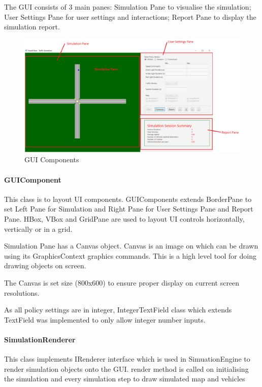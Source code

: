 \documentclass[11pt]{article}
\begin{document}
{\begin{itemize}
The GUI consists of 3 main panes: Simulation Pane to visualise the simulation; User Settings Pane for user settings and interactions; Report Pane to display the simulation report. 

 \begin{figure}[H]
        \includegraphics[width=16cm]{GUIComponent} 
        \caption{GUI Components } 
        \label{gui}
    \end{figure}
    
    
    \paragraph{GUIComponent}
    This class is to layout UI components. GUIComponents extends BorderPane to set Left Pane for Simulation and Right Pane for User Settings Pane and Report Pane. 
    HBox, VBox and GridPane are used to layout UI controls horizontally, vertically or in a grid. 
    
    Simulation Pane has a Canvas object. Canvas is an image  on which can be drawn using its GraphicsContext graphics commands. This is a high level tool for doing drawing objects on screen. 
        
    The Canvas is set size (800x600) to ensure proper display on current screen resolutions. 
    
    
    
    As all policy settings are in integer, IntegerTextField  class which extends TextField was implemented to only allow integer number inputs.
    
    
    
    \paragraph{SimulationRenderer}
    
    This class implements IRenderer interface which is used in SimuationEngine to render simulation objects onto the GUI. render method is called on initialising the simulation and every simulation step to draw simulated map and vehicles
    

\end{itemize}}
\end{document}
